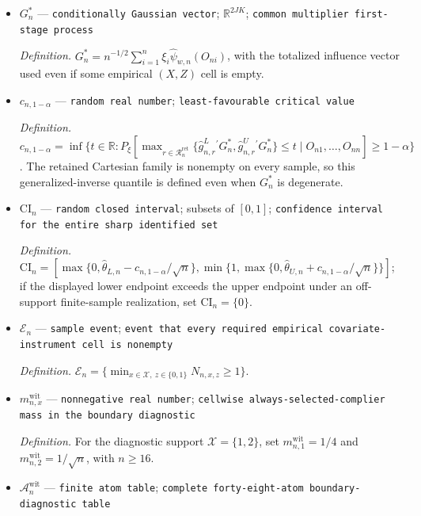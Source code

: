 \documentclass{article}
\begin{document}
\begin{itemize}
  \par\smallskip\noindent\emph{Definition.} \texttt{Independent standard Gaussian multipliers,\allowbreak{} independent of the data.}
  \item \(G_n^*\) --- \texttt{conditionally Gaussian vector}; \(\mathbb R^{2JK}\); \texttt{common multiplier first-\allowbreak{}stage process}
  \par\smallskip\noindent\emph{Definition.} \(G_n^*=n^{-1/2}\sum_{i=1}^n\xi_i\widehat\psi_{w,n}(O_{ni})\), with the totalized influence vector used even if some empirical \((X,Z)\) cell is empty.
  \item \(c_{n,1-\alpha}\) --- \texttt{random real number}; \texttt{least-\allowbreak{}favourable critical value}
  \par\smallskip\noindent\emph{Definition.} \(c_{n,1-\alpha}=\inf\{t\in\mathbb R:P_{\xi}[\max_{r\in\mathcal R_n^{\mathrm{ret}}}\{\widehat g^L_{n,r}{}^{\prime}G_n^*,\widehat g^U_{n,r}{}^{\prime}G_n^*\}\le t\mid O_{n1},\ldots,O_{nn}]\ge1-\alpha\}\). The retained Cartesian family is nonempty on every sample, so this generalized-inverse quantile is defined even when \(G_n^*\) is degenerate.
  \item \(\mathrm{CI}_n\) --- \texttt{random closed interval}; subsets of \([0,1]\); \texttt{confidence interval for the entire sharp identified set}
  \par\smallskip\noindent\emph{Definition.} \(\mathrm{CI}_n=[\max\{0,\widehat\theta_{L,n}-c_{n,1-\alpha}/\sqrt n\},\min\{1,\max\{0,\widehat\theta_{U,n}+c_{n,1-\alpha}/\sqrt n\}\}]\); if the displayed lower endpoint exceeds the upper endpoint under an off-support finite-sample realization, set \(\mathrm{CI}_n=\{0\}\).
  \item \(\mathcal E_n\) --- \texttt{sample event}; \texttt{event that every required empirical covariate-\allowbreak{}instrument cell is nonempty}
  \par\smallskip\noindent\emph{Definition.} \(\mathcal E_n=\{\min_{x\in\mathcal X,\ z\in\{0,1\}}N_{n,x,z}\ge1\}\).
  \item \(m^{\mathrm{wit}}_{n,x}\) --- \texttt{nonnegative real number}; \texttt{cellwise always-\allowbreak{}selected-\allowbreak{}complier mass in the boundary diagnostic}
  \par\smallskip\noindent\emph{Definition.} For the diagnostic support \(\mathcal X=\{1,2\}\), set \(m^{\mathrm{wit}}_{n,1}=1/4\) and \(m^{\mathrm{wit}}_{n,2}=1/\sqrt n\), with \(n\ge16\).
  \item \(\mathcal A_n^{\mathrm{wit}}\) --- \texttt{finite atom table}; \texttt{complete forty-\allowbreak{}eight-\allowbreak{}atom boundary-\allowbreak{}diagnostic table}

\end{itemize}
\end{document}
